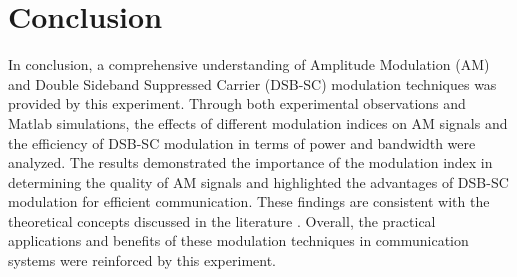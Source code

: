 \documentclass[12pt]{article}
\begin{document}
\section*{Conclusion}
In conclusion, a comprehensive understanding of Amplitude Modulation (AM) and Double Sideband Suppressed Carrier (DSB-SC) modulation techniques was provided by this experiment. Through both experimental observations and Matlab simulations, the effects of different modulation indices on AM signals and the efficiency of DSB-SC modulation in terms of power and bandwidth were analyzed. The results demonstrated the importance of the modulation index in determining the quality of AM signals and highlighted the advantages of DSB-SC modulation for efficient communication. These findings are consistent with the theoretical concepts discussed in the literature \cite{haykin2008communication, proakis2007digital}. Overall, the practical applications and benefits of these modulation techniques in communication systems were reinforced by this experiment.


\renewcommand{\bibname}{References}

\end{document}
